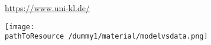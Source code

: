 
\url{https://www.uni-kl.de/}

\texttt{[image: \\pathToResource /dummy1/material/modelvsdata.png]}
\cite{Dahmen}


